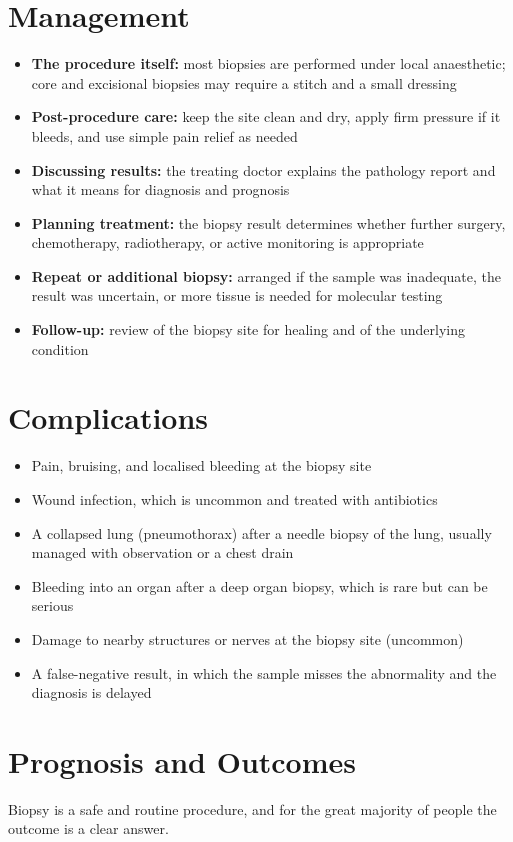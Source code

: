 \section*{Management}
\begin{itemize}
    \item \textbf{The procedure itself:} most biopsies are performed under local anaesthetic; core and excisional biopsies may require a stitch and a small dressing
    \item \textbf{Post-procedure care:} keep the site clean and dry, apply firm pressure if it bleeds, and use simple pain relief as needed
    \item \textbf{Discussing results:} the treating doctor explains the pathology report and what it means for diagnosis and prognosis
    \item \textbf{Planning treatment:} the biopsy result determines whether further surgery, chemotherapy, radiotherapy, or active monitoring is appropriate
    \item \textbf{Repeat or additional biopsy:} arranged if the sample was inadequate, the result was uncertain, or more tissue is needed for molecular testing
    \item \textbf{Follow-up:} review of the biopsy site for healing and of the underlying condition
\end{itemize}

\section*{Complications}
\begin{itemize}
    \item Pain, bruising, and localised bleeding at the biopsy site
    \item Wound infection, which is uncommon and treated with antibiotics
    \item A collapsed lung (pneumothorax) after a needle biopsy of the lung, usually managed with observation or a chest drain
    \item Bleeding into an organ after a deep organ biopsy, which is rare but can be serious
    \item Damage to nearby structures or nerves at the biopsy site (uncommon)
    \item A false-negative result, in which the sample misses the abnormality and the diagnosis is delayed
\end{itemize}

\section*{Prognosis and Outcomes}
Biopsy is a safe and routine procedure, and for the great majority of people the outcome is a clear answer.

